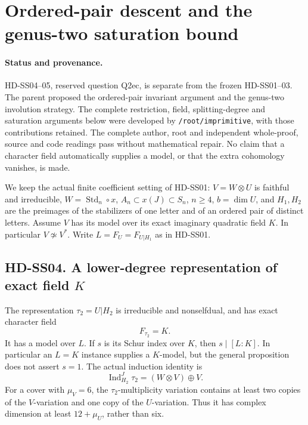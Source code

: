 \section{Ordered-pair descent and the genus-two saturation bound}
\label{sec:standard-ordered-pair-genus}

\paragraph{Status and provenance.}
HD-SS04--05, reserved question Q2ec, is separate from the frozen
HD-SS01--03.  The parent proposed the ordered-pair invariant argument
and the genus-two involution strategy.  The complete restriction,
field, splitting-degree and saturation arguments below were developed
by \texttt{/root/imprimitive}, with those contributions retained.
The complete author, root and independent whole-proof, source and
code readings pass without mathematical repair.  No claim that a character field automatically supplies a
model, or that the extra cohomology vanishes, is made.

We keep the actual finite coefficient setting of HD-SS01:
$V=W\otimes U$ is faithful and irreducible,
$W=\operatorname{Std}_n\circ x$, $A_n\subset x(J)\subset S_n$,
$n\ge4$, $b=\dim U$, and $H_1,H_2$ are the preimages of the
stabilizers of one letter and of an ordered pair of distinct letters.
Assume $V$ has its model over its exact imaginary quadratic field
$K$.  In particular $V\not\simeq V^*$.
Write $L=F_U=F_{U|H_1}$ as in HD-SS01.

\subsection*{HD-SS04. A lower-degree representation of exact field $K$}

\begin{proposition}[HD-SS04]
The representation $\tau_2=U|H_2$ is irreducible and nonselfdual,
and has exact character field
\[
                             F_{\tau_2}=K.
 \tag{SSX.1}
\]
It has a model over $L$.  If $s$ is its Schur index over $K$,
then $s\mid[L:K]$.  In particular an $L=K$ instance supplies a
$K$-model, but the general proposition does not assert $s=1$.
The actual induction identity is
\[
       \operatorname{Ind}_{H_2}^J\tau_2
                     =(W\otimes V)\oplus V.
 \tag{SSX.2}
\]
For a cover with $\mu_V=6$, the $\tau_2$-multiplicity variation
contains at least two copies of the $V$-variation and one copy of
the $U$-variation.  Thus it has complex dimension at least
$12+\mu_U$, rather than six.
\end{proposition}

